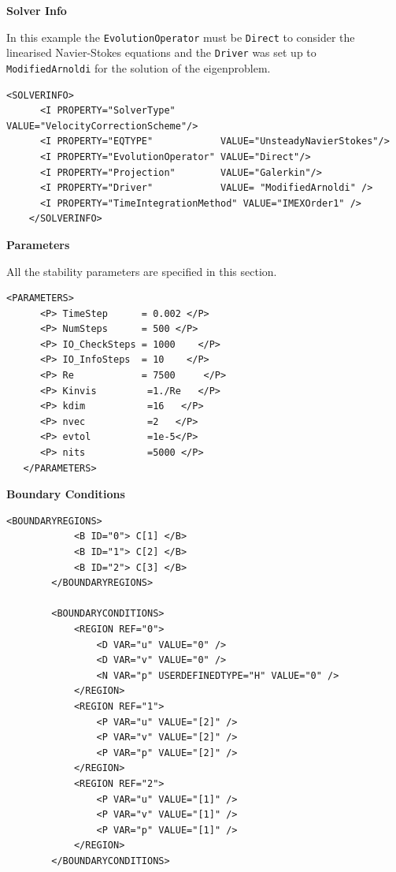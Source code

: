   \textbf{Solver Info}
  
  In this example the \texttt{EvolutionOperator} must be \texttt{Direct} to consider the linearised Navier-Stokes equations and the \texttt{Driver} was set up to \texttt{ModifiedArnoldi} for the solution of the eigenproblem. 
  
    \begin{lstlisting}[style=XMLStyle]
      <SOLVERINFO>
      <I PROPERTY="SolverType"        VALUE="VelocityCorrectionScheme"/>
      <I PROPERTY="EQTYPE"            VALUE="UnsteadyNavierStokes"/>
      <I PROPERTY="EvolutionOperator" VALUE="Direct"/>
      <I PROPERTY="Projection"        VALUE="Galerkin"/>
      <I PROPERTY="Driver"            VALUE= "ModifiedArnoldi" />
      <I PROPERTY="TimeIntegrationMethod" VALUE="IMEXOrder1" />    
    </SOLVERINFO>
      \end{lstlisting}


\textbf{Parameters}

All the stability parameters are specified in this section. 

    \begin{lstlisting}[style=XMLStyle]
<PARAMETERS>
      <P> TimeStep      = 0.002 </P>
      <P> NumSteps      = 500 </P>
      <P> IO_CheckSteps = 1000    </P>
      <P> IO_InfoSteps  = 10    </P>
      <P> Re            = 7500     </P>
      <P> Kinvis         =1./Re   </P>
      <P> kdim           =16   </P>
      <P> nvec           =2   </P>
      <P> evtol          =1e-5</P>
      <P> nits           =5000 </P>
   </PARAMETERS>
         \end{lstlisting}
         
         
\textbf{Boundary Conditions}

    \begin{lstlisting}[style=XMLStyle]
 <BOUNDARYREGIONS>
            <B ID="0"> C[1] </B>
            <B ID="1"> C[2] </B>
            <B ID="2"> C[3] </B>
        </BOUNDARYREGIONS>

        <BOUNDARYCONDITIONS>
            <REGION REF="0">
                <D VAR="u" VALUE="0" />
                <D VAR="v" VALUE="0" />
                <N VAR="p" USERDEFINEDTYPE="H" VALUE="0" />
            </REGION>
            <REGION REF="1">
                <P VAR="u" VALUE="[2]" />
                <P VAR="v" VALUE="[2]" />
                <P VAR="p" VALUE="[2]" />
            </REGION>
            <REGION REF="2">
                <P VAR="u" VALUE="[1]" />
                <P VAR="v" VALUE="[1]" />
                <P VAR="p" VALUE="[1]" />
            </REGION>
        </BOUNDARYCONDITIONS>
                 \end{lstlisting}

